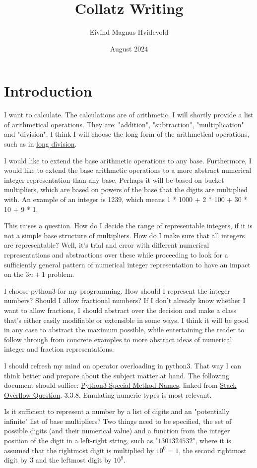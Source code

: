 \documentclass[10pt]{extarticle}
\title{Collatz Writing}
\author{Eivind Magnus Hvidevold}
\date{August 2024}
\begin{document}
\maketitle

\section{Introduction}

I want to calculate. The calculations are of arithmetic. I will shortly provide a list of arithmetical operations.
They are: "addition", "subtraction", "multiplication" and "division". I think I will choose the long form of the arithmetical operations, such as in \href{https://en.wikipedia.org/wiki/Long_division}{long division}.

I would like to extend the base arithmetic operations to any base. Furthermore, I would like to extend the base arithmetic operations to a more abstract numerical integer representation than any base. Perhaps it will be based on bucket multipliers, which are based on powers of the base that the digits are multiplied with.  An example of an integer is 1239, which means 1 * 1000 + 2 * 100 + 30 * 10 + 9 * 1.

This raises a question. How do I decide the range of representable integers, if it is not a simple base structure of multipliers. How do I make sure that all integers are representable? Well, it's trial and error with different numerical representations and abstractions over these while proceeding to look for a sufficiently general pattern of numerical integer representation to have an impact on the $3n + 1$ problem.

I choose python3 for my programming. How should I represent the integer numbers? Should I allow fractional numbers? If I don't already know whether I want to allow fractions, I should abstract over the decision and make a class that's either easily modifiable or extensible in some ways. I think it will be good in any case to abstract the maximum possible, while entertaining the reader to follow through from concrete examples to more abstract ideas of numerical integer and fraction representations.

I should refresh my mind on operator overloading in python3. That way I can think better and prepare about the subject matter at hand. The following document should suffice: \href{https://docs.python.org/3/reference/datamodel.html#special-method-names}{Python3 Special Method Names},
linked from \href{https://stackoverflow.com/questions/2400635/comprehensive-guide-to-operator-overloading-in-python}{Stack Overflow Question}. 3.3.8. Emulating numeric types is most relevant.

Is it sufficient to represent a number by a list of digits and an "potentially infinite" list of base multipliers? Two things need to be specified, the set of possible digits (and their numerical value) and a function from the integer position of the digit in a left-right string, such as "$1301324532$", where it is assumed that the rightmost digit is multiplied by $10^0 = 1$, the second rightmost digit by $3$ and the leftmost digit by $10^9$.

\end{document}

